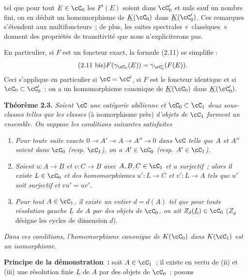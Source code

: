 tel que
pour tout $E\in\cC_0$ les $F^i(E)$ soient dans $\cC'_0$ et nuls sauf un nombre fini, on en déduit un homomorphisme de $\underline{K}(\cC_0)$ dans $\underline{K}(\cC'_0)$. Ces remarques s'étendent aux multifoncteurs~; de plus, les suites spectrales «~classiques~» donnent des propriétés de transitivité que nous n'expliciterons pas.

En particulier, si $F$ est un foncteur exact, la formule (2.11) se simplifie :
\begin{equation}\tag{2.11 bis}
 F(\gamma_{\cC_0}(E))=\gamma_{\cC'_0}(F(E)).
\end{equation}
Ceci s'applique en particulier si $\cC=\cC'$, si $F$ est le foncteur identique et si $\cC_0\subset\cC'_0$~: on a un homomorphisme canonique de $\underline{K}(\cC_0)$ dans $\underline{K}(\cC'_0)$.

\textbf{Théorème 2.3.} \emph{Soient $\cC$ une catégorie abélienne et $\cC_0\subset\cC_1$ deux sous-classes telles que les classes} (à isomorphisme près) \emph{d'objets de $\cC_1$ forment un ensemble. On suppose les conditions suivantes satisfaites}
\begin{enumerate}[label=(\roman*)]
\item \emph{Pour toute suite exacte $0\to A'\to A\to A''\to0$ dans $\cC$ telle que $A$ et $A''$ soient dans $\cC_0$ (resp. $\cC_1$), on a $A'\in\cC_0$ (resp. $A'\in\cC_1$).}
\item \emph{Soient $u:A\to B$ et $v:C\to B$ avec $A,B,C\in\cC_1$ et $u$ surjectif~; alors il existe $L\in\cC_0$ et des homomorphismes $u':L\to C$ et $v':L\to A$ tels que $u'$ soit surjectif et $vu'=uv'$.}
\item \emph{Pour tout $A\in\cC_1$, il existe un entier $d=d(A)$ tel que pour toute résolution gauche $\underline{L}$ de $A$ par des objets de $\cC_0$, on ait $Z_d(\underline{L})\in\cC_0$} ($Z_d$ désigne les cycles de dimension $d$).
\end{enumerate}
\emph{Dans ces conditions, l'homomorphisme canonique de $K(\cC_0)$ dans $K(\cC_1)$ est un isomorphisme.}

\textbf{Principe de la démonstration~:} soit $A\in\cC_1$~; il existe en vertu de (ii) et (iii) une résolution finie $\underline{L}$ de $A$ par des objets de $\cC_0$~; posons
